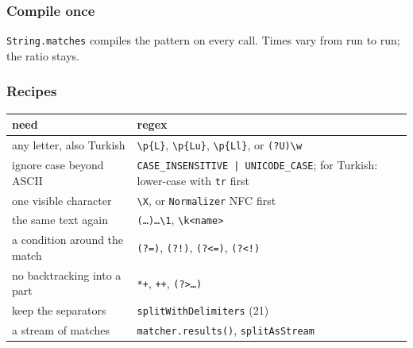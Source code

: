 \documentclass[aspectratio=169,10pt,compress]{beamer}
\begin{document}
\begin{frame}[t,fragile] \frametitle{Compile once}

  \vspace{0.2em}
  \small \texttt{String.matches} compiles the pattern on every call. Times vary from run to run; the ratio stays.
\end{frame}





\begin{frame}[t,fragile] \frametitle{Recipes}
  \begin{center}\footnotesize
  \begin{tabular}{@{}L{0.38\textwidth}L{0.56\textwidth}@{}}
    \toprule
    \textbf{need}                              & \textbf{regex} \\
    \midrule
    any letter, also Turkish                   & \texttt{\textbackslash p\{L\}}, \texttt{\textbackslash p\{Lu\}}, \texttt{\textbackslash p\{Ll\}}, or \texttt{(?U)\textbackslash w} \\
    ignore case beyond ASCII                   & \texttt{CASE\_INSENSITIVE | UNICODE\_CASE}; for Turkish: lower-case with \texttt{tr} first \\
    one visible character                      & \texttt{\textbackslash X}, or \texttt{Normalizer} NFC first \\
    the same text again                        & \texttt{(\dots)\dots\textbackslash 1}, \texttt{\textbackslash k<name>} \\
    a condition around the match               & \texttt{(?=)}, \texttt{(?!)}, \texttt{(?<=)}, \texttt{(?<!)} \\
    no backtracking into a part                & \texttt{*+}, \texttt{++}, \texttt{(?>\dots)} \\
    keep the separators                        & \texttt{splitWithDelimiters} (21) \\
    a stream of matches                        & \texttt{matcher.results()}, \texttt{splitAsStream} \\
    \bottomrule
  \end{tabular}
  \end{center}
\end{frame}
\end{document}
